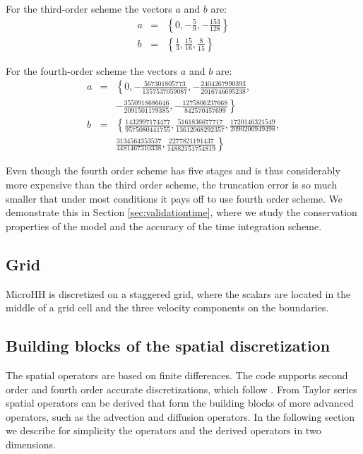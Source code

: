 \documentclass[gmd]{copernicus}
\begin{document}
For the third-order scheme the vectors $a$ and $b$ are:
\begin{eqnarray}
a & = & \left\{0, -\frac{5}{9}, -\frac{153}{128} \right\}\\
b & = & \left\{\frac{1}{3}, \frac{15}{16}, \frac{8}{15} \right\}
\end{eqnarray}

For the fourth-order scheme the vectors $a$ and $b$ are:
\begin{eqnarray}
\nonumber a & = & \left\{0, -\frac{567301805773}{1357537059087},
-\frac{2404267990393}{2016746695238},\right.\\
& & \left. -\frac{3550918686646}{2091501179385},
-\frac{1275806237668}{842570457699} \right\}\\
\nonumber b & = & \left\{\frac{1432997174477}{9575080441755}, \frac{5161836677717}{13612068292357},
\frac{1720146321549}{2090206949498},\right.\\
& & \left. \frac{3134564353537}{4481467310338},
\frac{2277821191437}{14882151754819} \right\}
\end{eqnarray}

Even though the fourth order scheme has five stages and is thus considerably more expensive than the third order scheme, the truncation error is so much smaller that under most conditions it pays off to use fourth order scheme. We demonstrate this in Section \ref{sec:validationtime}, where we study the conservation properties of the model and the accuracy of the time integration scheme.

\subsection{Grid}
MicroHH is discretized on a staggered grid, where the scalars are located in the middle of a grid cell and the three velocity components on the boundaries. 

\subsection{Building blocks of the spatial discretization}
The spatial operators are based on finite differences. The code supports second order and fourth order accurate discretizations, which follow \citet{Morinishi1998, Vasilyev2000}. From Taylor series spatial operators can be derived that form the building blocks of more advanced operators, such as the advection and diffusion operators. In the following section we describe for simplicity the operators and the derived operators in two dimensions.
\end{document}
